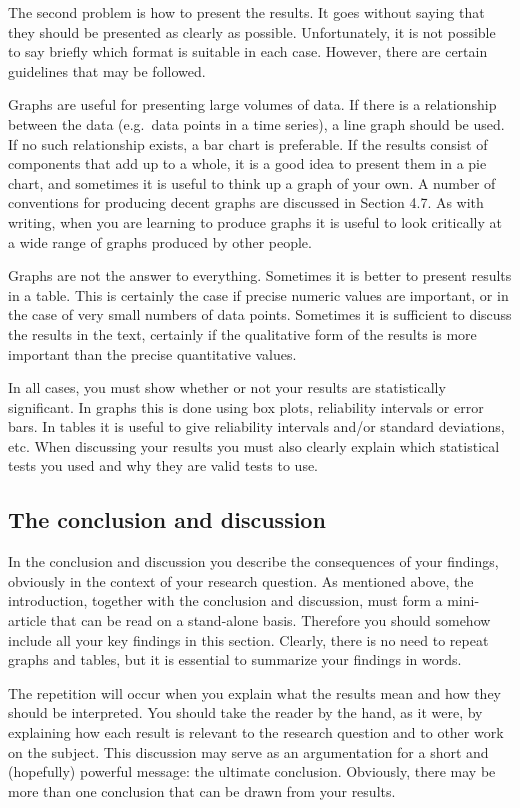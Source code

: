 The second problem is how to present the results.
It goes without saying that they should be presented as clearly as possible.
Unfortunately, it is not possible to say briefly which format is suitable in each case.
However, there are certain guidelines that may be followed.

Graphs are useful for presenting large volumes of data.
If there is a relationship between the data (e.g.\ data points in a time series), a line graph should be used.
If no such relationship exists, a bar chart is preferable.
If the results consist of components that add up to a whole, it is a good idea to present them in a pie chart, and sometimes it is useful to think up a graph of your own.
A number of conventions for producing decent graphs are discussed in Section 4.7.
As with writing, when you are learning to produce graphs it is useful to look critically at a wide range of graphs produced by other people.

Graphs are not the answer to everything.
Sometimes it is better to present results in a table.
This is certainly the case if precise numeric values are important, or in the case of very small numbers of data points.
Sometimes it is sufficient to discuss the results in the text, certainly if the qualitative form of the results is more important than the precise quantitative values.

In all cases, you must show whether or not your results are statistically significant.
In graphs this is done using box plots, reliability intervals or error bars.
In tables it is useful to give reliability intervals and/or standard deviations, etc.
When discussing your results you must also clearly explain which statistical tests you used and why they are valid tests to use.

\subsection{The conclusion and discussion}\label{sec:_conclusion_discussion}
In the conclusion and discussion you describe the consequences of your findings, obviously in the context of your research question.
As mentioned above, the introduction, together with the conclusion and discussion, must form a mini-article that can be read on a stand-alone basis.
Therefore you should somehow include all your key findings in this section.
Clearly, there is no need to repeat graphs and tables, but it is essential to summarize your findings in words.

The repetition will occur when you explain what the results mean and how they should be interpreted.
You should take the reader by the hand, as it were, by explaining  how each result is relevant to the research question and to other work on the subject.
This discussion may serve as an argumentation for a short and (hopefully) powerful message: the ultimate conclusion.
Obviously, there may be more than one conclusion that can be drawn from your results.

